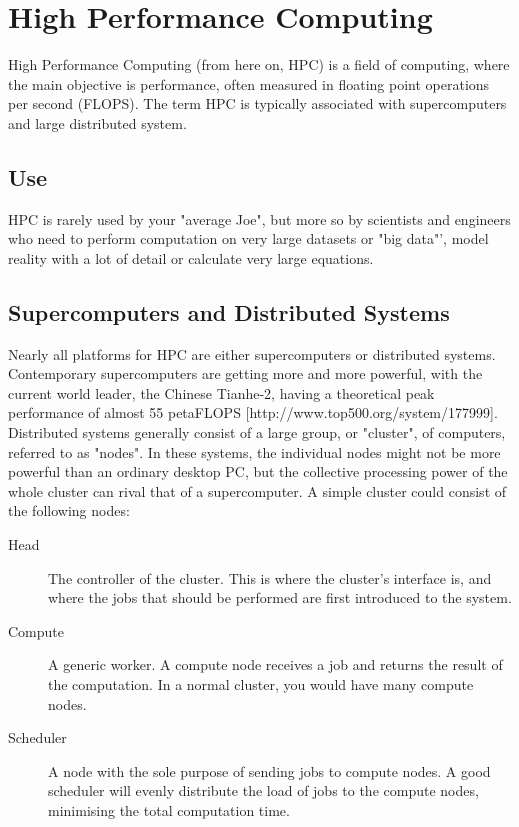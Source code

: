 \chapter{High Performance Computing}
High Performance Computing (from here on, HPC) is a field of computing, where the main objective is performance, often measured in floating point operations per second (FLOPS). The term HPC is typically associated with supercomputers and large distributed system.

\section{Use}
HPC is rarely used by your "average Joe", but more so by scientists and engineers who need to perform computation on very large datasets or "big data"', model reality with a lot of detail or calculate very large equations.

\section{Supercomputers and Distributed Systems}
Nearly all platforms for HPC are either supercomputers or distributed systems. Contemporary supercomputers are getting more and more powerful, with the current world leader, the Chinese Tianhe-2, having a theoretical peak performance of almost 55 petaFLOPS [http://www.top500.org/system/177999].
Distributed systems generally consist of a large group, or "cluster", of computers, referred to as "nodes". In these systems, the individual nodes might not be more powerful than an ordinary desktop PC, but the collective processing power of the whole cluster can rival that of a supercomputer.
A simple cluster could consist of the following nodes:
\begin{description}
	\item [Head]
	The controller of the cluster. This is where the cluster's interface is, and where the jobs that should be performed are first introduced to the system.
	\item [Compute]
	A generic worker. A compute node receives a job and returns the result of the computation. In a normal cluster, you would have many compute nodes.
	\item [Scheduler]
	A node with the sole purpose of sending jobs to compute nodes. A good scheduler will evenly distribute the load of jobs to the compute nodes, minimising the total computation time.
\end{description}

